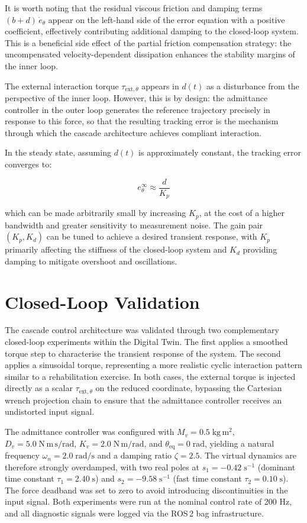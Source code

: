 It is worth noting that the residual viscous friction and damping terms $(b + d)\,\dot e_\theta$ appear on the left-hand side of the error equation with a positive coefficient, effectively contributing additional damping to the closed-loop system. This is a beneficial side effect of the partial friction compensation strategy: the uncompensated velocity-dependent dissipation enhances the stability margins of the inner loop.
 
The external interaction torque $\tau_{\mathrm{ext},\theta}$ appears in $d(t)$ as a disturbance from the perspective of the inner loop. However, this is by design: the admittance controller in the outer loop generates the reference trajectory precisely in response to this force, so that the resulting tracking error is the mechanism through which the cascade architecture achieves compliant interaction.
 
In the steady state, assuming $d(t)$ is approximately constant, the tracking error converges to:

\begin{equation}
    e_\theta^\infty \approx \frac{d}{K_p}
\end{equation}

which can be made arbitrarily small by increasing $K_p$, at the cost of a higher bandwidth and greater sensitivity to measurement noise. The gain pair $(K_p, K_d)$ can be tuned to achieve a desired transient response, with $K_p$ primarily affecting the stiffness of the closed-loop system and $K_d$ providing damping to mitigate overshoot and oscillations.

\section{Closed-Loop Validation}
The cascade control architecture was validated through two complementary closed-loop experiments within the Digital Twin. The first applies a smoothed torque step to characterise the transient response of the system. The second applies a sinusoidal torque, representing a more realistic cyclic interaction pattern similar to a rehabilitation exercise. In both cases, the external torque is injected directly as a scalar $\tau_{\mathrm{ext},\theta}$ on the reduced coordinate, bypassing the Cartesian wrench projection chain to ensure that the admittance controller receives an undistorted input signal.
 
The admittance controller was configured with $M_v = 0.5\;\mathrm{kg\,m^2}$, $D_v = 5.0\;\mathrm{N\,m\,s/rad}$, $K_v = 2.0\;\mathrm{N\,m/rad}$, and $\theta_{\mathrm{eq}} = 0\;\mathrm{rad}$, yielding a natural frequency $\omega_n = 2.0\;\mathrm{rad/s}$ and a damping ratio $\zeta = 2.5$. The virtual dynamics are therefore strongly overdamped, with two real poles at $s_1 = -0.42\;\mathrm{s^{-1}}$ (dominant time constant $\tau_1 = 2.40\;\mathrm{s}$) and $s_2 = -9.58\;\mathrm{s^{-1}}$ (fast time constant $\tau_2 = 0.10\;\mathrm{s}$). The force deadband was set to zero to avoid introducing discontinuities in the input signal. Both experiments were run at the nominal control rate of 200 Hz, and all diagnostic signals were logged via the ROS\,2 bag infrastructure.

